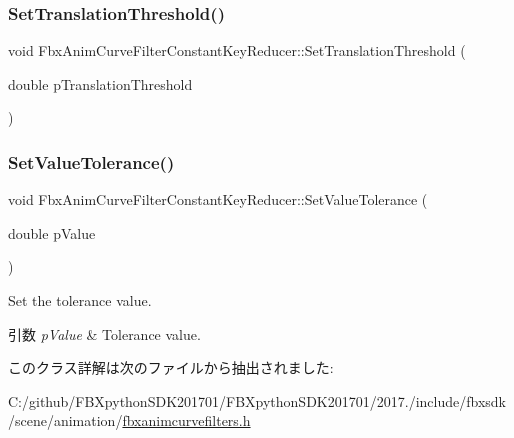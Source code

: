 \mbox{\label{class_fbx_anim_curve_filter_constant_key_reducer_acc31edd257d4b94cc91a899b7d45deb2}} 
\subsubsection{\texorpdfstring{Set\+Translation\+Threshold()}{SetTranslationThreshold()}}
{\footnotesize\ttfamily void Fbx\+Anim\+Curve\+Filter\+Constant\+Key\+Reducer\+::\+Set\+Translation\+Threshold (\begin{DoxyParamCaption}\item[{double}]{p\+Translation\+Threshold }\end{DoxyParamCaption})}

\mbox{\label{class_fbx_anim_curve_filter_constant_key_reducer_a86a4427b2a29f5a82a0d1535048a44eb}} 
\subsubsection{\texorpdfstring{Set\+Value\+Tolerance()}{SetValueTolerance()}}
{\footnotesize\ttfamily void Fbx\+Anim\+Curve\+Filter\+Constant\+Key\+Reducer\+::\+Set\+Value\+Tolerance (\begin{DoxyParamCaption}\item[{double}]{p\+Value }\end{DoxyParamCaption})}

Set the tolerance value. 
\begin{DoxyParams}{引数}
{\em p\+Value} & Tolerance value. \\
\hline
\end{DoxyParams}


このクラス詳解は次のファイルから抽出されました\+:\begin{DoxyCompactItemize}
\item 
C\+:/github/\+F\+B\+Xpython\+S\+D\+K201701/\+F\+B\+Xpython\+S\+D\+K201701/2017./include/fbxsdk/scene/animation/\hyperlink{fbxanimcurvefilters_8h}{fbxanimcurvefilters.\+h}\end{DoxyCompactItemize}
